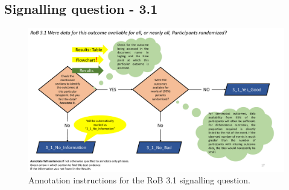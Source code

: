 \documentclass[sn-mathphys,Numbered]{sn-jnl}%
\begin{document}
\subsection*{Signalling question - 3.1 }
%
\begin{figure}[hbt]
    \centering
    \includegraphics[width=\textwidth]{figures/3_1.pdf}
    \caption{Annotation instructions for the RoB 3.1 signalling question.}
    \label{fig:3_1}
\end{figure}

%
%
%
\end{document}
